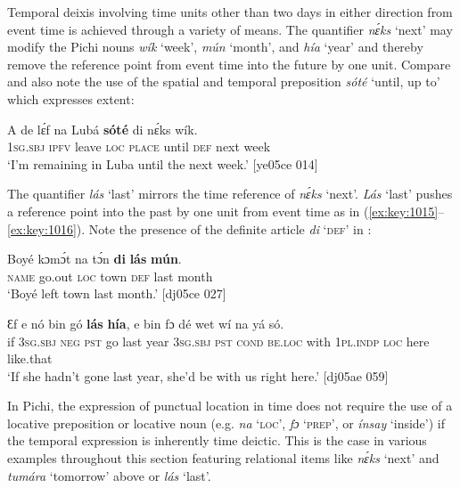 Temporal deixis involving time units other than two days in either direction from event time is achieved through a variety of means. The quantifier{\fff} \textit{nɛ́ks} ‘next’ may modify the Pichi nouns \textit{wík} ‘week’, \textit{mún} ‘month’, and \textit{hía} ‘year’ and thereby remove the reference point from event time into the future by one unit. Compare  and also note the use of the spatial and temporal preposition \textit{sóté} ‘until, up to’ which expresses extent: 



\ea%
    \label{ex:key:1014}
    \gll A    de  lɛ́f    na  Lubá  \textbf{sóté}    di  nɛ́ks  wík.\\
\textsc{1sg.sbj}  \textsc{ipfv}  leave  \textsc{loc}  \textsc{place}  until  \textsc{def}  next    week\\

\glt ‘I’m remaining in Luba until the next week.’ [ye05ce 014]
\z

The quantifier \textit{lás} ‘last’ mirrors the time reference of \textit{nɛ́ks} ‘next’. \textit{Lás} ‘last’ pushes a reference point into the past by one unit from event time as in (\ref{ex:key:1015}–\ref{ex:key:1016}). Note the presence of the definite article \textit{di} ‘\textsc{def}’ in : {\fff}


\ea%
    \label{ex:key:1015}
    \gll Boyé  kɔmɔ́t  na  tɔ́n    \textbf{di}  \textbf{lás} \textbf{mún}.\\
\textsc{name}  go.out  \textsc{loc}  town  \textsc{def}  last  month\\

\glt ‘Boyé left town last month.’ [dj05ce 027]
\z


\ea%
    \label{ex:key:1016}
    \gll Ɛf  e    nó  bin  gó  \textbf{lás} \textbf{hía},    e    bin  fɔ    dé
wet    wí    na  yá    só.\\
if  \textsc{3sg.sbj}  \textsc{neg}  \textsc{pst}  go  last  year    \textsc{3sg.sbj}  \textsc{pst}  \textsc{cond}    \textsc{be.loc}
with    \textsc{1pl.indp}  \textsc{loc}  here    like.that\\

\glt ‘If she hadn’t gone last year, she’d be with us right here.’ [dj05ae 059]
\z

In Pichi, the expression of punctual location in time does not require the use of a locative preposition{\fff} or locative noun{\fff} (e.g. \textit{na} ‘\textsc{loc}’, \textit{fɔ} ‘\textsc{prep}’, or \textit{ínsay} ‘inside’) if the temporal expression is inherently time deictic. This is the case in various examples throughout this section featuring relational items like \textit{nɛ́ks} ‘next’ and \textit{tumára} ‘tomorrow’ above or \textit{lás} ‘last’. 


